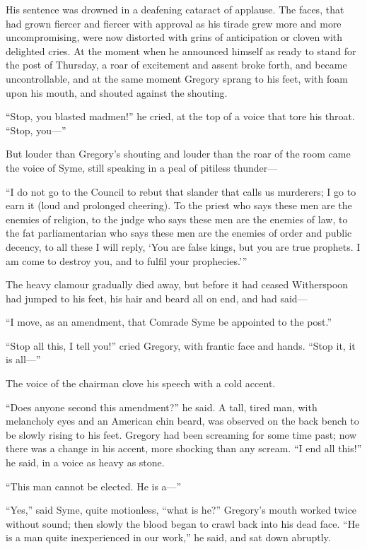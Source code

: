 His sentence was drowned in a deafening cataract of applause. The faces, that had grown fiercer and fiercer with approval as his tirade grew more and more uncompromising, were now distorted with grins of anticipation or cloven with delighted cries. At the moment when he announced himself as ready to stand for the post of Thursday, a roar of excitement and assent broke forth, and became uncontrollable, and at the same moment Gregory sprang to his feet, with foam upon his mouth, and shouted against the shouting.

“Stop, you blasted madmen!” he cried, at the top of a voice that tore his throat. “Stop, you⁠—”

But louder than Gregory’s shouting and louder than the roar of the room came the voice of Syme, still speaking in a peal of pitiless thunder⁠—

“I do not go to the Council to rebut that slander that calls us murderers; I go to earn it (loud and prolonged cheering). To the priest who says these men are the enemies of religion, to the judge who says these men are the enemies of law, to the fat parliamentarian who says these men are the enemies of order and public decency, to all these I will reply, ‘You are false kings, but you are true prophets. I am come to destroy you, and to fulfil your prophecies.’ ”

The heavy clamour gradually died away, but before it had ceased Witherspoon had jumped to his feet, his hair and beard all on end, and had said⁠—

“I move, as an amendment, that Comrade Syme be appointed to the post.”

“Stop all this, I tell you!” cried Gregory, with frantic face and hands. “Stop it, it is all⁠—”

The voice of the chairman clove his speech with a cold accent.

“Does anyone second this amendment?” he said. A tall, tired man, with melancholy eyes and an American chin beard, was observed on the back bench to be slowly rising to his feet. Gregory had been screaming for some time past; now there was a change in his accent, more shocking than any scream. “I end all this!” he said, in a voice as heavy as stone.

“This man cannot be elected. He is a⁠—”

“Yes,” said Syme, quite motionless, “what is he?” Gregory’s mouth worked twice without sound; then slowly the blood began to crawl back into his dead face. “He is a man quite inexperienced in our work,” he said, and sat down abruptly.

